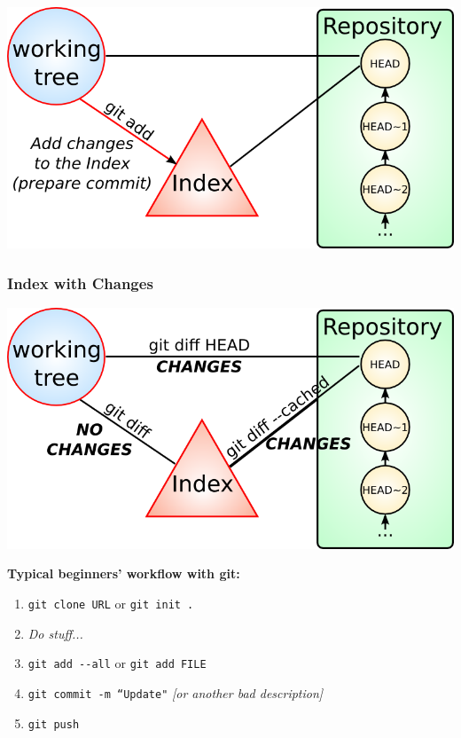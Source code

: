 
\begin{frame}

  \begin{center}
    \includegraphics[width=1.0\textwidth]{images/git-add.png}
  \end{center}
\end{frame}


\begin{frame}
  \frametitle{Index with Changes}

  \begin{center}
    \includegraphics[width=1.0\textwidth]{images/git-diff-cached-changes.png}
  \end{center}
\end{frame}


\begin{frame}

  \textbf{Typical beginners' workflow with git:\\}

  \begin{enumerate}
    \item \texttt{git clone URL} or \texttt{git init .}
    \item \textit{Do stuff...}
    \item \texttt{git add -{}-all} or \texttt{git add FILE}
    \item \texttt{git commit -m ``Update"} \textit{[or another bad description]}
    \item \texttt{git push}
  \end{enumerate}
\end{frame}

